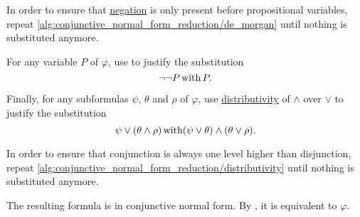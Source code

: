 \begin{algorithm}
\begin{algenum}
    In order to ensure that \hyperref[def:propositional_language/negation]{negation} is only present before propositional variables, repeat \ref{alg:conjunctive_normal_form_reduction/de_morgan} until nothing is substituted anymore.

     For any variable \( P \) of \( \varphi \), use  to justify the substitution
    \begin{equation*}
      \neg \neg P \mathop{\text{with}} P.
    \end{equation*}

     Finally, for any subformulas \( \psi \), \( \theta \) and \( \rho \) of \( \varphi \), use \hyperref[eq:def:distributive_lattice/distributivity]{distributivity} of \( \wedge \) over \( \vee \) to justify the substitution
    \begin{equation*}
      \psi \vee (\theta \wedge \rho) \mathop{\text{with}} (\psi \vee \theta) \wedge (\theta \vee \rho).
    \end{equation*}

    In order to ensure that conjunction is always one level higher than disjunction, repeat \ref{alg:conjunctive_normal_form_reduction/distributivity} until nothing is substituted anymore.
  \end{algenum}

  The resulting formula is in conjunctive normal form. By , it is equivalent to \( \varphi \).
\end{algorithm}
